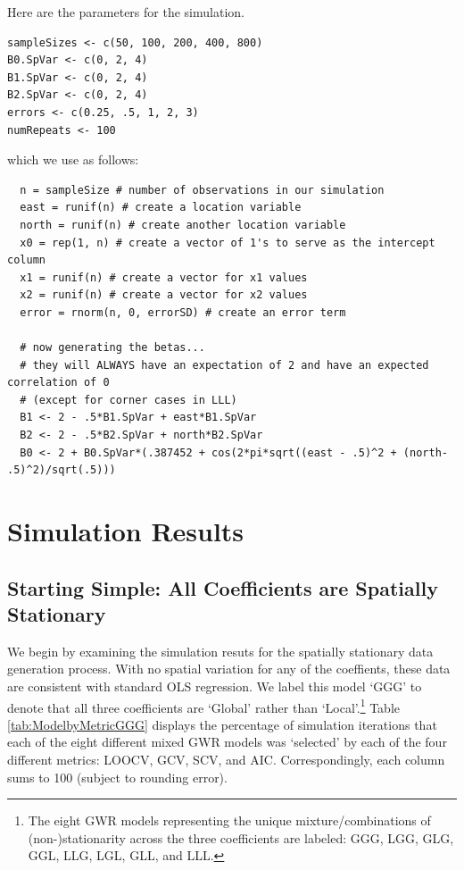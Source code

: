 \documentclass{article}\usepackage[]{graphicx}\usepackage[]{color}
\begin{document}
Here are the parameters for the simulation.
\begin{verbatim}
sampleSizes <- c(50, 100, 200, 400, 800) 
B0.SpVar <- c(0, 2, 4)  
B1.SpVar <- c(0, 2, 4) 
B2.SpVar <- c(0, 2, 4) 
errors <- c(0.25, .5, 1, 2, 3)
numRepeats <- 100
\end{verbatim}

which we use as follows:

\begin{verbatim}
  n = sampleSize # number of observations in our simulation
  east = runif(n) # create a location variable
  north = runif(n) # create another location variable
  x0 = rep(1, n) # create a vector of 1's to serve as the intercept column
  x1 = runif(n) # create a vector for x1 values
  x2 = runif(n) # create a vector for x2 values
  error = rnorm(n, 0, errorSD) # create an error term
  
  # now generating the betas...
  # they will ALWAYS have an expectation of 2 and have an expected correlation of 0 
  # (except for corner cases in LLL)  
  B1 <- 2 - .5*B1.SpVar + east*B1.SpVar
  B2 <- 2 - .5*B2.SpVar + north*B2.SpVar
  B0 <- 2 + B0.SpVar*(.387452 + cos(2*pi*sqrt((east - .5)^2 + (north- .5)^2)/sqrt(.5)))
\end{verbatim}

\section{Simulation Results}

\subsection{Starting Simple: All Coefficients are Spatially Stationary}

We begin by examining the simulation resuts for the spatially stationary data generation process. With no spatial variation for any of the coeffients, these data are consistent with standard OLS regression. We label this model `GGG' to denote that all three coefficients are `Global' rather than `Local'.\footnote{The eight GWR models representing the unique mixture/combinations of (non-)stationarity across the three coefficients are labeled: GGG, LGG, GLG, GGL, LLG, LGL, GLL, and LLL.} Table \ref{tab:ModelbyMetricGGG} displays the percentage of simulation iterations that each of the eight different mixed GWR models was `selected' by each of the four different metrics: LOOCV, GCV, SCV, and AIC. Correspondingly, each column sums to 100 (subject to rounding error). 
\end{document}

